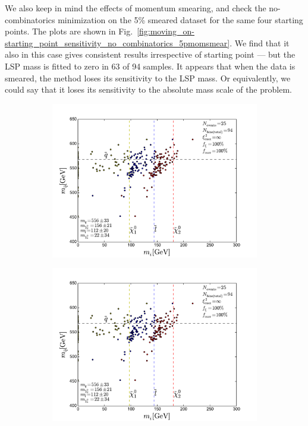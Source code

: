 \documentclass[twoside,english]{uiofysmaster}
\begin{document}
We also keep in mind the effects of momentum smearing, and check the no-combinatorics minimization on the 5\% smeared dataset for the same four starting points. The plots are shown in Fig.\ \ref{fig:moving_on-starting_point_sensitivity_no_combinatorics_5pmomsmear}. We find that it also in this case gives consistent results irrespective of starting point --- but the LSP mass is fitted to zero in 63 of 94 samples. It appears that when the data is smeared, the method loses its sensitivity to the LSP mass. Or equivalently, we could say that it loses its sensitivity to the absolute mass scale of the problem. 
\begin{figure}[hbt]
	\centering
	\begin{subfigure}[b]{0.45\textwidth}
		\includegraphics[width=\textwidth]{figures/improving_combinatorics/herwigpp_5psmear_lowtol_nocomb_TMP.pdf} 
		\caption{ }
	\end{subfigure}
	\begin{subfigure}[b]{0.45\textwidth}
		\includegraphics[width=\textwidth]{figures/improving_combinatorics/herwigpp_5psmear_lowtol_nocomb_400-300-200-100.pdf}
		\caption{ } 
	\end{subfigure}


\end{figure}
\end{document}
